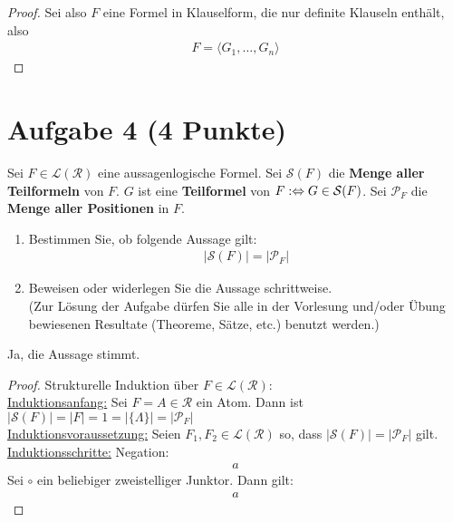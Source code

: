 \documentclass[12pt,a4paper]{article}
\renewcommand{\L}{\mathcal{L}} %
\newcommand{\RR}{\mathcal{R}} %
\newcommand{\PP}{\mathcal{P}} %
\renewcommand{\S}{\mathcal{S}} %
\begin{document}
\begin{proof}
Sei also $F$ eine Formel in Klauselform, die nur definite Klauseln enthält, also
\begin{align*}
F=\langle G_1,\ldots,G_n\rangle
\end{align*}


\end{proof}

\section*{Aufgabe 4 (4 Punkte)}
Sei $F\in\L(\RR)$ eine aussagenlogische Formel. Sei $\S(F)$ die  \textbf{Menge aller Teilformeln} von $F$. $G$ ist eine \textbf{Teilformel} von $F:\gdw G\in \S(F)$. Sei $\mathcal{P}_F$ die \textbf{Menge aller Positionen} in $F$.
\begin{enumerate}
\item Bestimmen Sie, ob folgende Aussage gilt:
\begin{align*}
\big|\S(F)\big|=\big|\PP_F\big|
\end{align*}
\item Beweisen oder widerlegen Sie die Aussage schrittweise.\\
(Zur Lösung der Aufgabe dürfen Sie alle in der Vorlesung und/oder Übung bewiesenen Resultate (Theoreme, Sätze, etc.) benutzt werden.)
\end{enumerate}
\begin{lösung}
Ja, die Aussage stimmt.
\begin{proof}
Strukturelle Induktion über $F\in\L(\RR)$:\\
\underline{Induktionsanfang:} Sei $F=A\in\RR$ ein Atom. Dann ist $|\S(F)|=|F|=1=|\lbrace\Lambda\rbrace|=|\PP_F|$\\

\underline{Induktionsvoraussetzung:} Seien $F_1,F_2\in\L(\RR)$    so, dass $\big|\S(F)\big|=\big|\PP_F\big|$ gilt.\\

\underline{Induktionsschritte:}
Negation:
\begin{align*}
a
\end{align*}
Sei $\circ$ ein beliebiger zweistelliger Junktor. Dann gilt:
\begin{align*}
a
\end{align*}
\end{proof}
\end{lösung}
\end{document}
